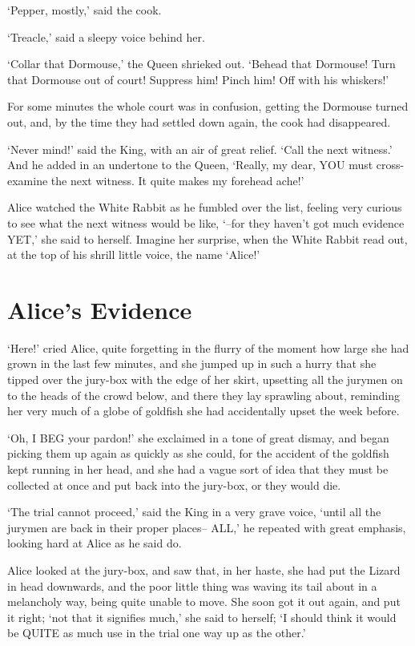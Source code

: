 \documentclass[12pt]{book}
\begin{document}
  `Pepper, mostly,' said the cook.

  `Treacle,' said a sleepy voice behind her.

  `Collar that Dormouse,' the Queen shrieked out.  `Behead that
Dormouse!  Turn that Dormouse out of court!  Suppress him!  Pinch
him!  Off with his whiskers!'

  For some minutes the whole court was in confusion, getting the
Dormouse turned out, and, by the time they had settled down
again, the cook had disappeared.

  `Never mind!' said the King, with an air of great relief.
`Call the next witness.'  And he added in an undertone to the
Queen, `Really, my dear, YOU must cross-examine the next witness.
It quite makes my forehead ache!'

  Alice watched the White Rabbit as he fumbled over the list,
feeling very curious to see what the next witness would be like,
`--for they haven't got much evidence YET,' she said to herself.
Imagine her surprise, when the White Rabbit read out, at the top
of his shrill little voice, the name `Alice!'

\chapter{Alice's Evidence}

  `Here!' cried Alice, quite forgetting in the flurry of the
moment how large she had grown in the last few minutes, and she
jumped up in such a hurry that she tipped over the jury-box with
the edge of her skirt, upsetting all the jurymen on to the heads
of the crowd below, and there they lay sprawling about, reminding
her very much of a globe of goldfish she had accidentally upset
the week before.

  `Oh, I BEG your pardon!' she exclaimed in a tone of great
dismay, and began picking them up again as quickly as she could,
for the accident of the goldfish kept running in her head, and
she had a vague sort of idea that they must be collected at once
and put back into the jury-box, or they would die.

  `The trial cannot proceed,' said the King in a very grave
voice, `until all the jurymen are back in their proper places--
ALL,' he repeated with great emphasis, looking hard at Alice as
he said do.

  Alice looked at the jury-box, and saw that, in her haste, she
had put the Lizard in head downwards, and the poor little thing
was waving its tail about in a melancholy way, being quite unable
to move.  She soon got it out again, and put it right; `not that
it signifies much,' she said to herself; `I should think it
would be QUITE as much use in the trial one way up as the other.'
\end{document}
